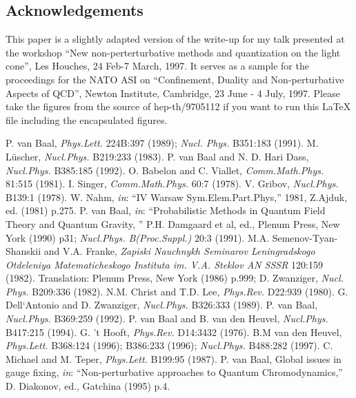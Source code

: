 \documentclass[12pt]{book}
\newcommand{\un}[1]{{\it #1}}
\begin{document}
\subsection{Acknowledgements}
This paper is a slightly adapted version of the write-up for my talk presented 
at the workshop ``New non-perterturbative methods and quantization on the light 
cone'', Les Houches, 24 Feb-7 March, 1997. It serves as a sample for the 
proceedings for the NATO ASI on ``Confinement, Duality and Non-perturbative
Aspects of QCD'', Newton Institute, Cambridge, 23 June - 4 July, 1997.
Please take the figures from the source of hep-th/9705112 if you want to 
run this LaTeX file including the encapsulated figures.
{
\begin{numbibliography}
 P. van Baal, \un{Phys.Lett.} 224B:397 (1989); 
\un{Nucl. Phys.} B351:183 (1991).
 M. L\"uscher, \un{Nucl.Phys.} B219:233 (1983). 
 P. van Baal and N. D. Hari Dass, \un{Nucl.Phys.} B385:185 (1992).
 O. Babelon  and C. Viallet, \un{Comm.Math.Phys.} 81:515 (1981).
 I. Singer, \un{Comm.Math.Phys.} 60:7 (1978).
 V. Gribov, \un{Nucl.Phys.} B139:1 (1978).
 W. Nahm, {\it in}: ``IV Warsaw Sym.Elem.Part.Phys,'' 1981, 
Z.Ajduk, ed. (1981) p.275.
 P. van Baal, {\it in}: ``Probabilistic Methods in Quantum Field 
Theory and Quantum Gravity, '' P.H. Damgaard et al, ed., Plenum Press, New York 
(1990) p31; \un{Nucl.Phys. B(Proc.Suppl.)} 20:3 (1991).
 M.A. Semenov-Tyan-Shanskii and V.A. Franke, \un{Zapiski Nauchnykh 
Seminarov Leningradskogo Otdeleniya Matematicheskogo Instituta im. V.A. Steklov
AN SSSR} 120:159 (1982). Translation: Plenum Press, New York (1986) p.999;
D. Zwanziger, \un{Nucl. Phys.} B209:336 (1982).
 N.M. Christ and T.D. Lee, \un{Phys.Rev.} D22:939 (1980).
 G. Dell`Antonio and D. Zwanziger, \un{Nucl.Phys.} 
B326:333 (1989).
 P. van Baal, \un{Nucl.Phys.} B369:259 (1992).
 P. van Baal and B. van den Heuvel, 
\un{Nucl.Phys.} B417:215 (1994).
 G. 't Hooft, \un{Phys.Rev.} D14:3432 (1976).
 B.M van den Heuvel, \un{Phys.Lett.} B368:124 (1996);
B386:233 (1996); \un{Nucl.Phys.} B488:282 (1997).
 C. Michael and M. Teper, \un{Phys.Lett.} B199:95 (1987).
 P. van Baal, Global issues in gauge fixing, {\it in}: 
``Non-perturbative approaches to Quantum Chromodynamics,'' D. Diakonov, ed.,
Gatchina (1995) p.4.
\end{numbibliography}
}
\end{document}
